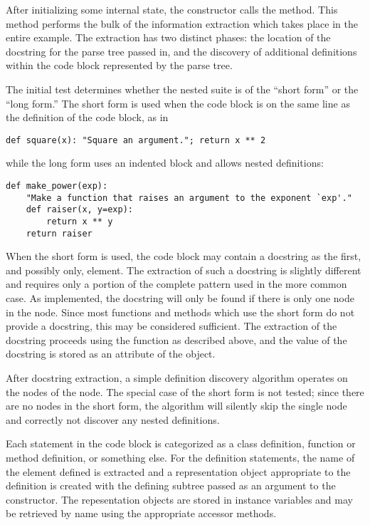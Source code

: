 After initializing some internal state, the constructor calls the
 method.  This method performs the bulk of the
information extraction which takes place in the entire example.  The
extraction has two distinct phases: the location of the docstring for
the parse tree passed in, and the discovery of additional definitions
within the code block represented by the parse tree.

The initial  test determines whether the nested suite is of
the ``short form'' or the ``long form.''  The short form is used when
the code block is on the same line as the definition of the code
block, as in

\begin{verbatim}
def square(x): "Square an argument."; return x ** 2
\end{verbatim}

while the long form uses an indented block and allows nested
definitions:

\begin{verbatim}
def make_power(exp):
    "Make a function that raises an argument to the exponent `exp'."
    def raiser(x, y=exp):
        return x ** y
    return raiser
\end{verbatim}

When the short form is used, the code block may contain a docstring as
the first, and possibly only,  element.  The
extraction of such a docstring is slightly different and requires only
a portion of the complete pattern used in the more common case.  As
implemented, the docstring will only be found if there is only
one  node in the  node.
Since most functions and methods which use the short form do not
provide a docstring, this may be considered sufficient.  The
extraction of the docstring proceeds using the  function
as described above, and the value of the docstring is stored as an
attribute of the  object.

After docstring extraction, a simple definition discovery
algorithm operates on the  nodes of the
 node.  The special case of the short form is not
tested; since there are no  nodes in the short form,
the algorithm will silently skip the single 
node and correctly not discover any nested definitions.

Each statement in the code block is categorized as
a class definition, function or method definition, or
something else.  For the definition statements, the name of the
element defined is extracted and a representation object
appropriate to the definition is created with the defining subtree
passed as an argument to the constructor.  The repesentation objects
are stored in instance variables and may be retrieved by name using
the appropriate accessor methods.

